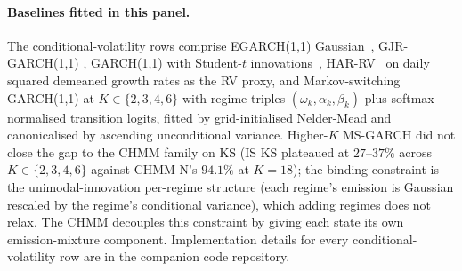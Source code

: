 \paragraph{Baselines fitted in this panel.}
The conditional-volatility rows comprise EGARCH(1,1) Gaussian~\citep{nelson1991conditional}, GJR-GARCH(1,1) \citep{glosten1993relation, zakoian1994threshold}, GARCH(1,1) with Student-$t$ innovations~\citep{bollerslev1987conditionally}, HAR-RV~\citep{corsi2009simple} on daily squared demeaned growth rates as the RV proxy, and Markov-switching GARCH(1,1) \citep{haas2004new} at $K \in \{2, 3, 4, 6\}$ with regime triples $(\omega_k, \alpha_k, \beta_k)$ plus softmax-normalised transition logits, fitted by grid-initialised Nelder-Mead and canonicalised by ascending unconditional variance. Higher-$K$ MS-GARCH did not close the gap to the CHMM family on KS (IS KS plateaued at $27$--$37\%$ across $K \in \{2, 3, 4, 6\}$ against CHMM-N's $94.1\%$ at $K = 18$); the binding constraint is the unimodal-innovation per-regime structure (each regime's emission is Gaussian rescaled by the regime's conditional variance), which adding regimes does not relax. The CHMM decouples this constraint by giving each state its own emission-mixture component. Implementation details for every conditional-volatility row are in the companion code repository.

